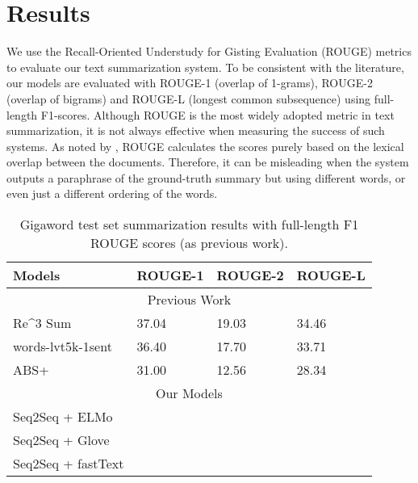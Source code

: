\section{Results}
\label{sec: result}

We use the Recall-Oriented Understudy for Gisting Evaluation (ROUGE) metrics \cite{lin2004rouge} to evaluate our text summarization system. To be consistent with the literature, our models are evaluated with ROUGE-1 (overlap of 1-grams), ROUGE-2 (overlap of bigrams) and ROUGE-L (longest common subsequence) using full-length F1-scores. Although ROUGE is the most widely adopted metric in text summarization, it is not always effective when measuring the success of such systems. As noted by \cite{cohan2016revisiting}, ROUGE calculates the scores purely based on the lexical overlap between the documents. Therefore, it can be misleading when the system outputs a paraphrase of the ground-truth summary but using different words, or even just a different ordering of the words.

\begin{table*}[ht]
\centering
\caption{Gigaword test set summarization results with full-length F1 ROUGE scores (as previous work).}
\begin{tabular}{|l|l|l|l|} 
\hline
Models                                        & \multicolumn{1}{c|}{ROUGE-1} & \multicolumn{1}{c|}{ROUGE-2} & \multicolumn{1}{c|}{ROUGE-L}  \\ 
\hline
\multicolumn{4}{|c|}{Previous Work}                                                                                                         \\ 
\hline
Re\^{}3 Sum \cite{cao2018retrieve}         & 37.04                        & 19.03                        & 34.46                         \\ 
\hline
words-lvt5k-1sent \cite{nallapati2016abstractive} & 36.40                        & 17.70                        & 33.71                         \\ 
\hline
ABS+ \cite{rush2015neural}              & 31.00                        & 12.56                        & 28.34                         \\ 
\hline
\multicolumn{4}{|c|}{Our Models}                                                                                                            \\ 
\hline
Seq2Seq + ELMo                                &                              &                              &                               \\ 
\hline
Seq2Seq + Glove                               &                              &                              &                               \\ 
\hline
Seq2Seq + fastText                            &                              &                              &                               \\
\hline
\end{tabular}
\end{table*}

